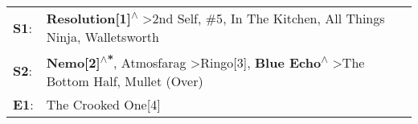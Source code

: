 \begin{supertabular}{p{0.03\textwidth}p{0.92\textwidth}}
 \textbf{S1}:  &                            \textbf{Resolution[1]\textsuperscript{$\wedge$}} \textgreater \enspace 2nd Self\textsuperscript{}, \enspace \#5\textsuperscript{}, \enspace In The Kitchen\textsuperscript{}, \enspace All Things Ninja\textsuperscript{}, \enspace Walletsworth\textsuperscript{}  \enspace  \\
 \textbf{S2}:  &  \textbf{Nemo[2]\textsuperscript{$\wedge$*}}, \enspace Atmosfarag\textsuperscript{} \textgreater \enspace Ringo[3]\textsuperscript{}, \enspace \textbf{Blue Echo\textsuperscript{$\wedge$}} \textgreater \enspace The Bottom Half\textsuperscript{}, \enspace Mullet (Over)\textsuperscript{}  \enspace  \\
 \textbf{E1}:  &                                                                                                                                                                                                                                                          The Crooked One[4]\textsuperscript{}  \enspace  \\
\end{supertabular}
